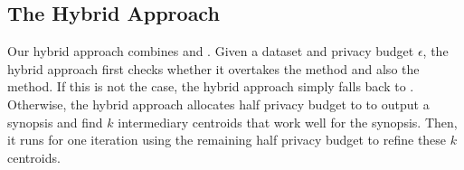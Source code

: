 \begin{comment}
\begin{figure*}[p]
	\begin{tabular}{cc}
	\texttt{[image: s1-performance.eps]} & \texttt{[image: s1-performance-closeup.eps]}\\
	(a) S1 dataset & (b) S1 dataset, close-up at large $\epsilon$\\
	\texttt{[image: gowalla-2d-performance.eps]} & \texttt{[image: gowalla-2d-performance-closeup.eps]}\\
	(c) Gowalla 2D dataset & (d) Gowalla 2D dataset, close-up at large $\epsilon$\\
\texttt{[image: gowalla-3d-performance.eps]} & \texttt{[image: gowalla-3d-performance-closeup.eps]}\\
	(e) Gowalla 3D dataset & (f) Gowalla 3D dataset, close-up at large $\epsilon$\\
	\end{tabular}
	\caption{The comparison of four algorithms proposed in this paper, by varying $\epsilon$}\label{fig:exp-vary-epsilon}
\end{figure*}

\begin{figure*}[p]
\begin{minipage}[b]{0.45\linewidth}
\centering
\texttt{[image: regression-all-in-one.eps]}
\caption{The linear regression for empirically finding the $\eta$ value.}\label{fig:regression}
\end{minipage}
\hspace{0.5cm}
\begin{minipage}[b]{0.45\linewidth}
\centering
\texttt{[image: ds1.10-scalability.eps]}\caption{The comparison of the UGkM and DPLloyd with varying dimensions.}\label{fig:exp-vary-N-dimension}
\end{minipage}
\end{figure*}
\end{comment}

\subsection{The Hybrid Approach}\label{ssec:hybrid}

Our hybrid approach combines \eugkm and \dpl. Given a dataset and privacy budget $\epsilon$, the hybrid approach first \mbox{checks} whether it overtakes the \dpl method and also the \eugkm method. If this is not the case, the hybrid approach simply falls back to \eugkm. Otherwise, the hybrid approach allocates half privacy budget to \eugkm to output a synopsis and find $k$ intermediary centroids that work well for the synopsis. Then, it runs \dpl for one iteration using the remaining half privacy budget to refine these $k$ centroids.

